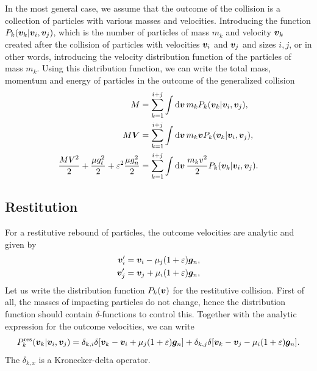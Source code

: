 \documentclass[aps,prl,preprint,groupedaddress,10pt]{revtex4-2}
\begin{document}
In the most general case, we assume that
the outcome of the collision is a collection of particles with various masses and
velocities. Introducing the function $P_k\pqty{\bv_k\vert\bv_i,\bv_j}$, which is the number of
particles of mass $m_k$ and velocity $\vb*{v}_k$ created after the collision of particles with
velocities $\vb*{v}_i$ and $\vb*{v}_j$ and sizes $i,j$,
or in other words, introducing the velocity distribution function of the particles of
mass $m_k$. Using this distribution function, we can write the total mass, momentum and
energy of particles in the outcome of the generalized collision
\begin{equation}
    \begin{split}
        M &= \sum_{k=1}^{i+j}\int\dd{\bv}m_kP_k\pqty{\bv_k\vert\bv_i,\bv_j},\\
        M\bV &= \sum_{k=1}^{i+j}\int\dd{\bv}m_k\bv P_k\pqty{\bv_k\vert\bv_i,\bv_j},\\
        \frac{MV^2}{2}+\frac{\mu g_t^2}{2}+\eps^2\frac{\mu g_n^2}{2} &=
        \sum_{k=1}^{i+j}\int\dd{\bv}\frac{m_kv^2}{2}P_k\pqty{\bv_k\vert\bv_i,\bv_j}.
    \end{split}
\end{equation}

\subsection{Restitution}
For a restitutive rebound of particles, the outcome velocities are analytic and given by
\begin{equation}
    \begin{split}
        \bv_i'&=\bv_i-\mu_j\pqty{1+\eps}\bg_n,\\
        \bv_j'&=\bv_j+\mu_i\pqty{1+\eps}\bg_n,
    \end{split}
\end{equation}
Let us write the distribution function $P_k\pqty{\bv}$ for the restitutive collision.
First of all, the masses of impacting particles do not change, hence the distribution
function should contain $\delta$-functions to control this. Together with the analytic
expression for the outcome velocities, we can write
\begin{equation}
    \utx{P_k}{res}\pqty{\bv_k\vert\bv_i,\bv_j}=
    \delta_{k,i}\delta\bqty{\bv_k-\bv_i+\mu_j\pqty{1+\eps}\bg_n}+
    \delta_{k,j}\delta\bqty{\bv_k-\bv_j-\mu_i\pqty{1+\eps}\bg_n}.
\end{equation}
The $\delta_{k,x}$ is a Kronecker-delta operator.
\end{document}
